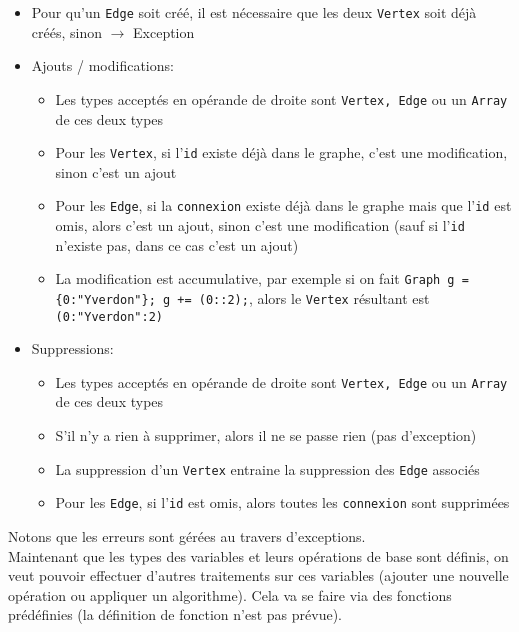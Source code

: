 \documentclass[french]{article}
\begin{document}
\begin{itemize}
\begin{itemize}
						\item Pour qu'un \texttt{Edge} soit créé, il est nécessaire que les deux \texttt{Vertex} soit déjà créés, sinon $\rightarrow$ Exception
						\item Ajouts / modifications:
						\begin{itemize}
							\item Les types acceptés en opérande de droite sont \texttt{Vertex, Edge} ou un \texttt{Array} de ces deux types
							\item Pour les \texttt{Vertex}, si l'\texttt{id} existe déjà dans le graphe, c'est une modification, sinon c'est un ajout
							\item Pour les \texttt{Edge}, si la \texttt{connexion} existe déjà dans le graphe mais que l'\texttt{id} est omis, alors c'est un ajout, sinon c'est une modification (sauf si l'\texttt{id} n'existe pas, dans ce cas c'est un ajout)
							\item La modification est accumulative, par exemple si on fait \texttt{Graph g = \{0:"Yverdon"\}; g += (0::2);}, alors le \texttt{Vertex} résultant est \texttt{(0:"Yverdon":2)}
						\end{itemize}
						\item Suppressions:
						\begin{itemize}
							\item Les types acceptés en opérande de droite sont \texttt{Vertex, Edge} ou un \texttt{Array} de ces deux types
							\item S'il n'y a rien à supprimer, alors il ne se passe rien (pas d'exception)
							\item La suppression d'un \texttt{Vertex} entraine la suppression des \texttt{Edge} associés
							\item Pour les \texttt{Edge}, si l'\texttt{id} est omis, alors toutes les \texttt{connexion} sont supprimées
						\end{itemize}
					\end{itemize}
				\end{itemize}
				
			Notons que les erreurs sont gérées au travers d'exceptions.\\
			
			Maintenant que les types des variables et leurs opérations de base sont définis, on veut pouvoir effectuer d'autres traitements sur ces variables (ajouter une nouvelle opération ou appliquer un algorithme). Cela va se faire via des fonctions prédéfinies (la définition de fonction n'est pas prévue).\\
			
\end{document}
